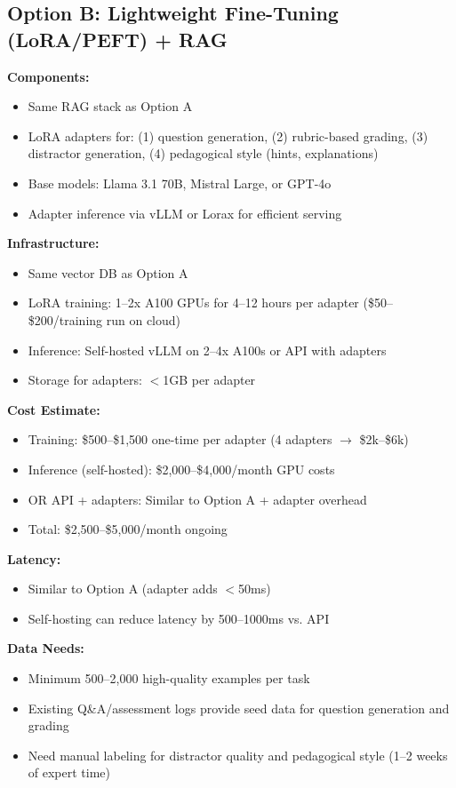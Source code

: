 \documentclass[11pt,letterpaper]{article}
\begin{document}
\subsection{Option B: Lightweight Fine-Tuning (LoRA/PEFT) + RAG}\label{subsec:option-b}

\textbf{Components:}
\begin{itemize}
\item Same RAG stack as Option A
\item LoRA adapters for: (1) question generation, (2) rubric-based grading, (3) distractor generation, (4) pedagogical style (hints, explanations)
\item Base models: Llama 3.1 70B, Mistral Large, or GPT-4o
\item Adapter inference via vLLM or Lorax for efficient serving
\end{itemize}

\textbf{Infrastructure:}
\begin{itemize}
\item Same vector DB as Option A
\item LoRA training: 1--2x A100 GPUs for 4--12 hours per adapter (\$50--\$200/training run on cloud)
\item Inference: Self-hosted vLLM on 2--4x A100s or API with adapters
\item Storage for adapters: $<$1GB per adapter
\end{itemize}

\textbf{Cost Estimate:}
\begin{itemize}
\item Training: \$500--\$1,500 one-time per adapter (4 adapters $\rightarrow$ \$2k--\$6k)
\item Inference (self-hosted): \$2,000--\$4,000/month GPU costs
\item OR API + adapters: Similar to Option A + adapter overhead
\item Total: \$2,500--\$5,000/month ongoing
\end{itemize}

\textbf{Latency:}
\begin{itemize}
\item Similar to Option A (adapter adds $<$50ms)
\item Self-hosting can reduce latency by 500--1000ms vs. API
\end{itemize}

\textbf{Data Needs:}
\begin{itemize}
\item Minimum 500--2,000 high-quality examples per task
\item Existing Q\&A/assessment logs provide seed data for question generation and grading
\item Need manual labeling for distractor quality and pedagogical style (1--2 weeks of expert time)
\end{itemize}
\end{document}
